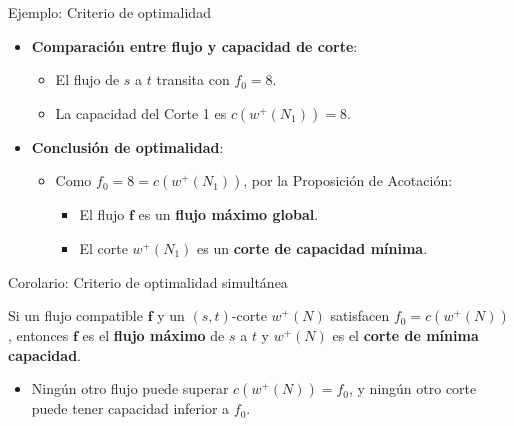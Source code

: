 \documentclass[
  ignorenonframetext,
]{beamer}
\providecommand{\tightlist}{%
  \setlength{\itemsep}{0pt}\setlength{\parskip}{0pt}}
\begin{document}
\begin{frame}{Ejemplo: Criterio de optimalidad}
\label{ejemplo-criterio-de-optimalidad}
\begin{itemize}
\tightlist
\item
  \textbf{Comparación entre flujo y capacidad de corte}:

  \begin{itemize}
  \tightlist
  \item
    El flujo de \(s\) a \(t\) transita con \(f_0 = 8\).
  \item
    La capacidad del Corte 1 es \(c(w^+(N_1)) = 8\).
  \end{itemize}
\item
  \textbf{Conclusión de optimalidad}:

  \begin{itemize}
  \tightlist
  \item
    Como \(f_0 = 8 = c(w^+(N_1))\), por la Proposición de Acotación:

    \begin{itemize}
    \tightlist
    \item
      El flujo \(\mathbf{f}\) es un \textbf{flujo máximo global}.
    \item
      El corte \(w^+(N_1)\) es un \textbf{corte de capacidad mínima}.
    \end{itemize}
  \end{itemize}
\end{itemize}
\end{frame}

\begin{frame}{Corolario: Criterio de optimalidad simultánea}
\label{corolario-criterio-de-optimalidad-simultuxe1nea}
\begin{tcolorbox}[enhanced jigsaw, opacityback=0, breakable, title=\textcolor{quarto-callout-note-color}{\faInfo}\hspace{0.5em}{Criterio de optimalidad de flujo máximo y corte mínimo}, colback=white, colbacktitle=quarto-callout-note-color!10!white, bottomrule=.15mm, opacitybacktitle=0.6, coltitle=black, bottomtitle=1mm, leftrule=.75mm, colframe=quarto-callout-note-color-frame, toptitle=1mm, titlerule=0mm, rightrule=.15mm, left=2mm, arc=.35mm, toprule=.15mm]

Si un flujo compatible \(\mathbf{f}\) y un \((s, t)\)-corte \(w^+(N)\)
satisfacen \(f_0 = c(w^+(N))\), entonces \(\mathbf{f}\) es el
\textbf{flujo máximo} de \(s\) a \(t\) y \(w^+(N)\) es el \textbf{corte
de mínima capacidad}.

\end{tcolorbox}

\begin{itemize}
\tightlist
\item
  Ningún otro flujo puede superar \(c(w^+(N)) = f_0\), y ningún otro
  corte puede tener capacidad inferior a \(f_0\).
\end{itemize}
\end{frame}
\end{document}
